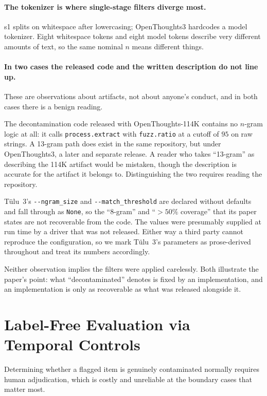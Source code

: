 \documentclass[11pt]{article}
\begin{document}
\paragraph{The tokenizer is where single-stage filters diverge most.}
s1 splits on whitespace after lowercasing; OpenThoughts3 hardcodes a model
tokenizer. Eight whitespace tokens and eight model tokens describe very different
amounts of text, so the same nominal $n$ means different things.

\paragraph{In two cases the released code and the written description do not
line up.} These are observations about artifacts, not about anyone's conduct, and
in both cases there is a benign reading.

The decontamination code released with OpenThoughts-114K contains no $n$-gram
logic at all: it calls \texttt{process.extract} with \texttt{fuzz.ratio} at a
cutoff of $95$ on raw strings. A 13-gram path does exist in the same repository,
but under OpenThoughts3, a later and separate release. A reader who takes
``13-gram'' as describing the 114K artifact would be mistaken, though the
description is accurate for the artifact it belongs to. Distinguishing the two
requires reading the repository.

T\"{u}lu~3's \texttt{-{}-ngram\_size} and \texttt{-{}-match\_threshold} are declared
without defaults and fall through as \texttt{None}, so the ``8-gram'' and
``$>50\%$ coverage'' that its paper states are not recoverable from the code. The
values were presumably supplied at run time by a driver that was not released.
Either way a third party cannot reproduce the configuration, so we mark T\"{u}lu~3's
parameters as prose-derived throughout and treat its numbers accordingly.

Neither observation implies the filters were applied carelessly. Both illustrate
the paper's point: what ``decontaminated'' denotes is fixed by an implementation,
and an implementation is only as recoverable as what was released alongside it.

\section{Label-Free Evaluation via Temporal Controls}
\label{sec:control}

Determining whether a flagged item is genuinely contaminated normally requires
human adjudication, which is costly and unreliable at the boundary cases that
matter most.
\end{document}
